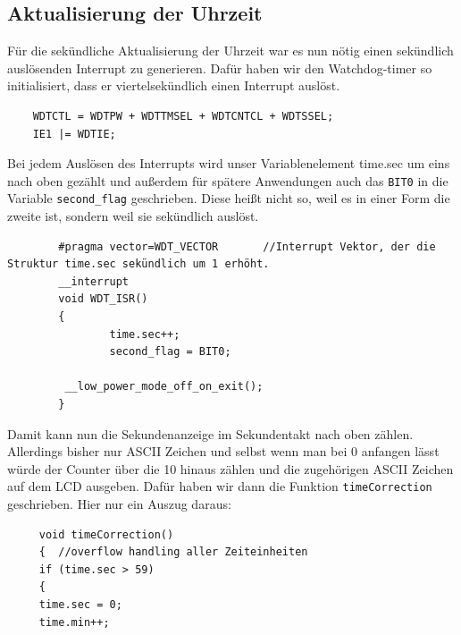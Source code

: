 \documentclass[openright,twoside,11pt,a4paper]{scrartcl}
\begin{document}
\begin{flushleft}
		\section{Aktualisierung der Uhrzeit}
		Für die sekündliche Aktualisierung der Uhrzeit war es nun nötig einen sekündlich auslösenden Interrupt zu generieren. Dafür haben wir den Watchdog-timer so initialisiert, dass er viertelsekündlich einen Interrupt auslöst. 
		\begin{lstlisting}
	WDTCTL = WDTPW + WDTTMSEL + WDTCNTCL + WDTSSEL; 
	IE1 |= WDTIE; 
		\end{lstlisting}
		Bei jedem Auslösen des Interrupts wird unser Variablenelement time.sec um eins nach oben gezählt und außerdem für spätere Anwendungen auch das \lstinline[language=C++]|BIT0| in die Variable \lstinline[language=c++]|second_flag| geschrieben. Diese heißt nicht so, weil es in einer Form die zweite ist, sondern weil sie sekündlich auslöst. \newpage
		 \begin{lstlisting}
	 	#pragma vector=WDT_VECTOR       //Interrupt Vektor, der die Struktur time.sec sekündlich um 1 erhöht.
		__interrupt
		void WDT_ISR()
		{
       			time.sec++;
       			second_flag = BIT0;

  		 __low_power_mode_off_on_exit();
		}
		 \end{lstlisting}
		 Damit kann nun die Sekundenanzeige im Sekundentakt nach oben zählen. Allerdings bisher nur ASCII Zeichen und selbst wenn man bei 0 anfangen lässt würde der Counter über die 10 hinaus zählen und die zugehörigen ASCII Zeichen auf dem LCD ausgeben. Dafür haben wir dann die Funktion \lstinline[language=c++]|timeCorrection| geschrieben. Hier nur ein Auszug daraus:
		 \begin{lstlisting}
	 void timeCorrection()    
	 {	//overflow handling aller Zeiteinheiten
	 if (time.sec > 59)
	 {
	 time.sec = 0;
	 time.min++;
	 

\end{lstlisting}
\end{flushleft}
\end{document}

